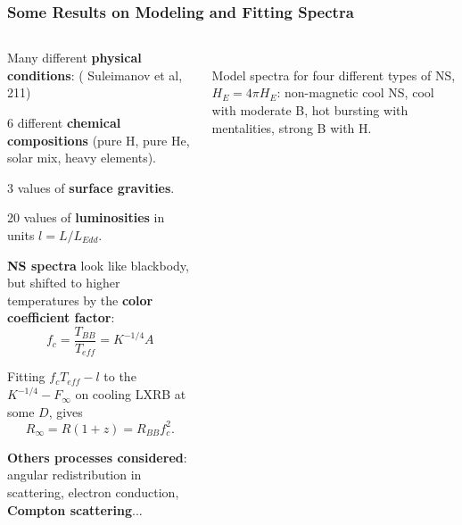 \begin{frame}
\frametitle{Some Results on Modeling and Fitting Spectra}
\begin{columns}[c]
\begin{column}{0.7\textwidth} 
\begin{enumerate}
\scriptsize{
\item Many different {\bf physical conditions}: {\tiny ( Suleimanov et al, 211)}
\begin{itemize}\scriptsize{
 \item 6 different {\bf chemical compositions} (pure H, pure He, solar mix, heavy elements).
 \item 3 values of {\bf surface gravities}.
 \item 20 values of {\bf luminosities} in units $l = L/L_{Edd}$.}
\end{itemize}

\quad
 
\item {\bf NS spectra} look like blackbody, but shifted to higher temperatures by the {\bf color coefficient factor}:
$$f_c = \frac{T_{BB}}{T_{eff}} = K^{-1/4}A $$

\item Fitting $f_cT_{eff}-l$ to the $K^{-1/4}-F_{\infty}$ on cooling LXRB  at some $D$, gives $$R_{\infty}=R(1+z)=R_{BB} f_c^2.$$ 

\quad

\item {\bf Others processes considered}: angular redistribution in scattering, electron conduction, {\bf Compton scattering}...
}
\end{enumerate}
\end{column}
\begin{column}{0.5\textwidth} 

 \\
 {\tiny Model spectra for four different types of NS, $H_E=4\pi H_E$: non-magnetic cool NS, cool with moderate B, hot bursting with mentalities, strong B with H.}


\end{column}
\end{columns}
\end{frame}
